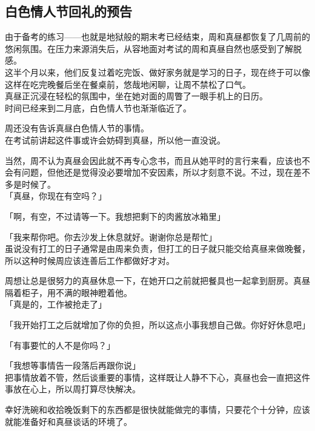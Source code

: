 \subsection{白色情人节回礼的预告}

由于备考的练习——也就是地狱般的期末考已经结束，周和真昼都恢复了几周前的悠闲氛围。在压力来源消失后，从容地面对考试的周和真昼自然也感受到了解脱感。\\

这半个月以来，他们反复过着吃完饭、做好家务就是学习的日子，现在终于可以像这样在吃完晚餐后坐在餐桌前，悠哉地闲聊，让周不禁松了口气。\\

真昼正沉浸在轻松的氛围中，坐在她对面的周瞥了一眼手机上的日历。\\

时间已经来到二月底，白色情人节也渐渐临近了。

周还没有告诉真昼白色情人节的事情。\\

在考试前讲起这件事或许会妨碍到真昼，所以他一直没说。

当然，周不认为真昼会因此就不再专心念书，而且从她平时的言行来看，应该也不会有问题，但他还是觉得没必要增加不安因素，所以才刻意不说。不过，现在差不多是时候了。\\

「真昼，你现在有空吗？」

「啊，有空，不过请等一下。我想把剩下的肉酱放冰箱里」

「我来帮你吧。你去沙发上休息就好。谢谢你总是帮忙」\\

虽说没有打工的日子通常是由周来负责，但打工的日子就只能交给真昼来做晚餐，所以这种时候周应该连善后工作都做好才对。

周想让总是很努力的真昼休息一下，在她开口之前就把餐具也一起拿到厨房。真昼隔着柜子，用不满的眼神瞪着他。\\

「真是的，工作被抢走了」

「我开始打工之后就增加了你的负担，所以这点小事我想自己做。你好好休息吧」

「有事要忙的人不是你吗？」

「我想等事情告一段落后再跟你说」\\

把事情放着不管，然后谈重要的事情，这样既让人静不下心，真昼也会一直把这件事放在心上，所以周打算尽快解决。

幸好洗碗和收拾晚饭剩下的东西都是很快就能做完的事情，只要花个十分钟，应该就能准备好和真昼谈话的环境了。\\

